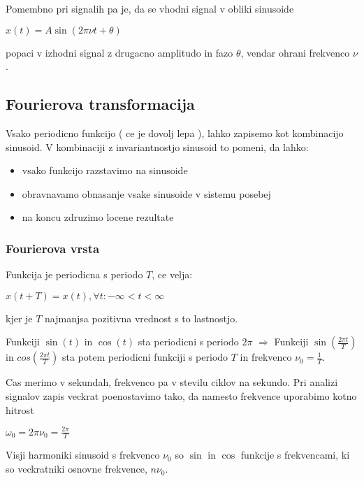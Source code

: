 \documentclass{article}
\begin{document}
\begin{multicols}{4}
	Pomembno pri signalih pa je, da se vhodni signal v obliki sinusoide
	\begin{center}
		\begin{math}
			x(t) = A \sin (2 \pi \nu t + \theta)
		\end{math}
	\end{center}
	popaci v izhodni signal z drugacno amplitudo in fazo $\theta$, vendar ohrani frekvenco $\nu$.

	\subsection{Fourierova transformacija}
	Vsako periodicno funkcijo ( ce je dovolj lepa ), lahko zapisemo kot kombinacijo sinusoid.
	V kombinaciji z invariantnostjo sinusoid to pomeni, da lahko:
	\begin{itemize}
		\item vsako funkcijo razstavimo na sinusoide
		\item obravnavamo obnasanje vsake sinusoide v sistemu posebej
		\item na koncu zdruzimo locene rezultate
	\end{itemize}

	\subsubsection{Fourierova vrsta}
	Funkcija je periodicna s periodo $T$, ce velja:
	\begin{center}
		\begin{math}
			x(t + T) = x(t), \forall t: -\infty < t < \infty
		\end{math}
	\end{center}
	kjer je $T$ najmanjsa pozitivna vrednost s to lastnostjo.

	Funkciji $\sin(t)$ in $\cos(t)$ sta periodicni s periodo $2\pi$  $\Rightarrow$
	Funkciji $\sin(\frac{2 \pi t}{T})$ in $cos(\frac{2 \pi t}{T})$ sta potem periodicni funkciji
	s periodo $T$ in frekvenco $\nu_0 = \frac{1}{T}$.

	Cas merimo v sekundah, frekvenco pa v stevilu ciklov na sekundo. Pri analizi
	signalov zapis veckrat poenostavimo tako, da namesto frekvence uporabimo kotno hitrost
	\begin{center}
		\begin{math}
			\omega_0 = 2 \pi \nu_0 = \frac{2\pi}{T}
		\end{math}
	\end{center}

	Visji harmoniki sinusoid s frekvenco $\nu_0$ so $\sin$ in $\cos$ funkcije s frekvencami,
	ki so veckratniki osnovne frekvence, $n \nu_0$.


\end{multicols}
\end{document}
